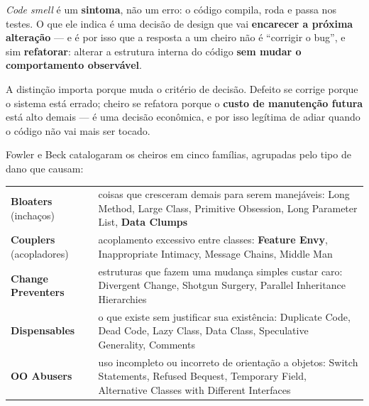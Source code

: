 \begin{conceito}
\textit{Code smell} é um \textbf{sintoma}, não um erro: o código compila,
roda e passa nos testes. O que ele indica é uma decisão de design que vai
\textbf{encarecer a próxima alteração} --- e é por isso que a resposta a um
cheiro não é “corrigir o bug”, e sim \textbf{refatorar}: alterar a estrutura
interna do código \textbf{sem mudar o comportamento observável}.

A distinção importa porque muda o critério de decisão. Defeito se corrige
porque o sistema está errado; cheiro se refatora porque o \textbf{custo de
manutenção futura} está alto demais --- é uma decisão econômica, e por isso
legítima de adiar quando o código não vai mais ser tocado.

Fowler e Beck catalogaram os cheiros em cinco famílias, agrupadas pelo tipo
de dano que causam:

\begin{center}
\begin{tabular}{@{}p{3.2cm}p{8.6cm}@{}}
\toprule
\textbf{Bloaters} \newline (inchaços) & coisas que cresceram demais para
serem manejáveis: Long Method, Large Class, Primitive Obsession, Long
Parameter List, \textbf{Data Clumps} \\
\addlinespace
\textbf{Couplers} \newline (acopladores) & acoplamento excessivo entre
classes: \textbf{Feature Envy}, Inappropriate Intimacy, Message Chains,
Middle Man \\
\addlinespace
\textbf{Change Preventers} & estruturas que fazem uma mudança simples custar
caro: Divergent Change, Shotgun Surgery, Parallel Inheritance Hierarchies \\
\addlinespace
\textbf{Dispensables} & o que existe sem justificar sua existência:
Duplicate Code, Dead Code, Lazy Class, Data Class, Speculative Generality,
Comments \\
\addlinespace
\textbf{OO Abusers} & uso incompleto ou incorreto de orientação a objetos:
Switch Statements, Refused Bequest, Temporary Field, Alternative Classes
with Different Interfaces \\
\bottomrule
\end{tabular}
\end{center}
\end{conceito}

